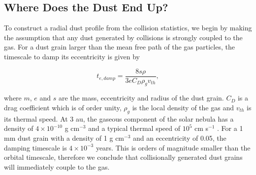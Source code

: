\documentclass[fleqn,usenatbib]{mnras}
\begin{document}
\subsection{Where Does the Dust End Up?}

To construct a radial dust profile from the collision statistics, we begin by making the assumption that any dust generated by collisions is strongly 
coupled to the gas. For a dust grain larger than the mean free path of the gas particles, the timescale to damp its eccentricity is given by 
\citep{1976PThPh..56.1756A}

\begin{equation}\label{eq:t_edamp}
    t_{e, damp} = \frac{8 s \rho}{3 e C_{D} \rho_{g} v_{th}},
\end{equation}

\noindent where $m$, $e$ and $s$ are the mass, eccentricity and radius of the dust grain. $C_{D}$ is a drag coefficient which is of order unity, $
\rho_{g}$ is the local density of the gas and $v_{th}$ is its thermal speed. At 3 au, the gaseous component of the solar nebula has a density of $4 
\times 10^{-10}$ g cm$^{-3}$ and a typical thermal speed of $10^{5}$ cm s$^{-1}$ \citep{1981PThPS..70...35H}. For a 1 mm dust grain with a 
density of 1 g cm$^{-3}$ and an eccentricity of 0.05, the damping timescale is $4 \times 10^{-3}$ years. This is orders of magnitude smaller than the 
orbital timescale, therefore we conclude that collisionally generated dust grains will immediately couple to the gas.
\end{document}
